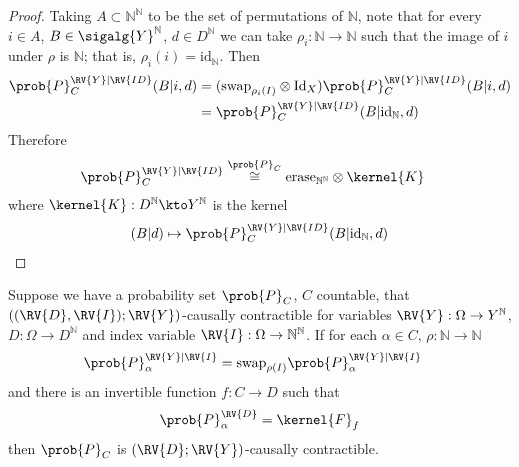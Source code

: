 \begin{proof}
Taking $A\subset \mathbb{N}^{\mathbb{N}}$ to be the set of permutations of $\mathbb{N}$, note that for every $i\in A$, $B\in\sigalg{Y}^{\mathbb{N}}$, $d\in D^{\mathbb{N}}$ we can take $\rho_i:\mathbb{N}\to \mathbb{N}$ such that the image of $i$ under $\rho$ is $\mathbb{N}$; that is, $\rho_i(i)=\text{id}_{\mathbb{N}}$. Then
\begin{align}
    \prob{P}_C^{\RV{Y}|\RV{ID}}(B|i,d) &= (\text{swap}_{\rho_i(I)}\otimes \text{Id}_X )\prob{P}_C^{\RV{Y}|\RV{ID}}(B|i,d)\\
    &= \prob{P}_C^{\RV{Y}|\RV{ID}}(B|\text{id}_{\mathbb{N}},d)
\end{align}
Therefore
\begin{align}
    \prob{P}_C^{\RV{Y}|\RV{ID}} &\overset{\prob{P}_C}{\cong} \text{erase}_{\mathbb{N}^{\mathbb{N}}}\otimes \kernel{K} 
\end{align}
where $\kernel{K}:D^{\mathbb{N}}\kto Y^{\mathbb{N}}$ is the kernel
\begin{align}
    (B|d)\mapsto \prob{P}_C^{\RV{Y}|\RV{ID}}(B|\text{id}_{\mathbb{N}},d)
\end{align}
\end{proof}


\begin{theorem}\label{th:cc_ind_treat}
Suppose we have a probability set $\prob{P}_C$, $C$ countable, that $((\RV{D},\RV{I});\RV{Y})$-causally contractible for variables $\RV{Y}:\Omega\to Y^{\mathbb{N}}$, $D:\Omega\to D^{\mathbb{N}}$ and index variable $\RV{I}:\Omega\to \mathbb{N}^{\mathbb{N}}$. If for each $\alpha\in C$, $\rho:\mathbb{N}\to \mathbb{N}$
\begin{align}
    \prob{P}_\alpha^{\RV{Y}|\RV{I}} &= \text{swap}_{\rho(I)}\prob{P}_\alpha^{\RV{Y}|\RV{I}}
\end{align}
and there is an invertible function $f:C\to D$ such that
\begin{align}
    \prob{P}_\alpha^{\RV{D}} = \kernel{F}_f
\end{align}
then $\prob{P}_C$ is $(\RV{D};\RV{Y})$-causally contractible.
\end{theorem}

